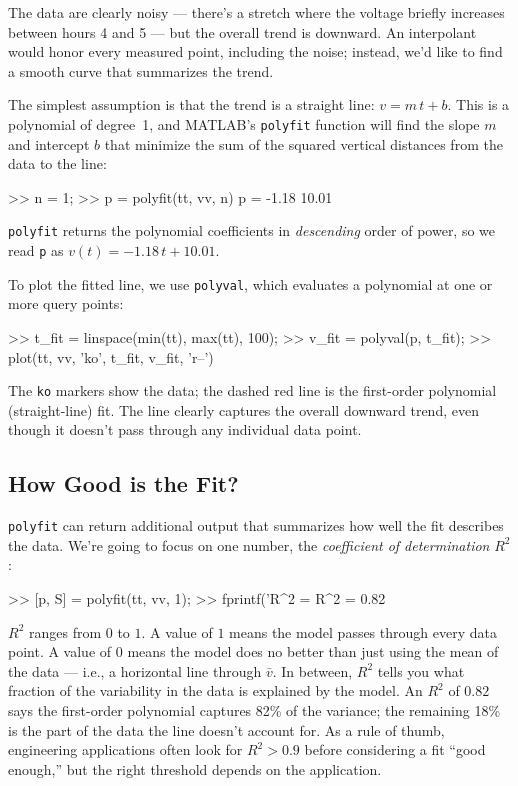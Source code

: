 \documentclass[../../book.tex]{subfiles}
\begin{document}
\noindent The data are clearly noisy --- there's a stretch where the voltage briefly increases between hours 4 and 5 --- but the overall trend is downward.  An interpolant would honor every measured point, including the noise; instead, we'd like to find a smooth curve that summarizes the trend.

The simplest assumption is that the trend is a straight line: $v = m\,t + b$.  This is a polynomial of degree~1, and MATLAB's \lstinline{polyfit} function will find the slope $m$ and intercept $b$ that minimize the sum of the squared vertical distances from the data to the line:

\begin{code}
>> n = 1;
>> p = polyfit(tt, vv, n)
p =
   -1.18    10.01
\end{code}

\noindent \lstinline{polyfit} returns the polynomial coefficients in \emph{descending} order of power, so we read \lstinline{p} as $v(t) = -1.18\,t + 10.01$.

To plot the fitted line, we use \lstinline{polyval}, which evaluates a polynomial at one or more query points:

\begin{code}
>> t_fit = linspace(min(tt), max(tt), 100);
>> v_fit = polyval(p, t_fit);
>> plot(tt, vv, 'ko', t_fit, v_fit, 'r--')
\end{code}

The \lstinline{ko} markers show the data; the dashed red line is the first-order polynomial (straight-line) fit.  The line clearly captures the overall downward trend, even though it doesn't pass through any individual data point.

\subsection{How Good is the Fit?}


\lstinline{polyfit} can return additional output that summarizes how well the fit describes the data.  We're going to focus on one number, the \emph{coefficient of determination} $R^2$:

\begin{code}
>> [p, S] = polyfit(tt, vv, 1);
>> fprintf('R^2 = %
R^2 = 0.82
\end{code}

\noindent $R^2$ ranges from $0$ to $1$.  A value of $1$ means the model passes through every data point.  A value of $0$ means the model does no better than just using the mean of the data --- i.e., a horizontal line through $\bar{v}$.  In between, $R^2$ tells you what fraction of the variability in the data is explained by the model.  An $R^2$ of $0.82$ says the first-order polynomial captures 82\% of the variance; the remaining 18\% is the part of the data the line doesn't account for.  As a rule of thumb, engineering applications often look for $R^2 > 0.9$ before considering a fit ``good enough,'' but the right threshold depends on the application.
\end{document}
